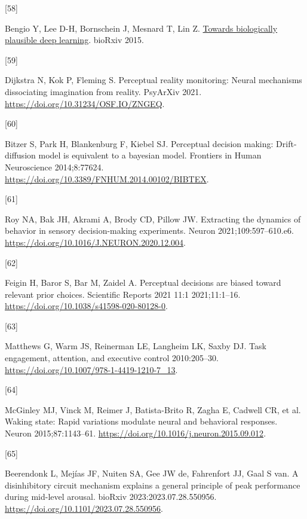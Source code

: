 \documentclass[
]{article}
\newlength{\cslhangindent}
\newlength{\csllabelwidth}
\newlength{\cslentryspacingunit} %
\newenvironment{CSLReferences}[2] %
 {%
  \setlength{\parindent}{0pt}
  \ifodd #1
  \let\oldpar\par
  \def\par{\hangindent=\cslhangindent\oldpar}
  \fi
  \setlength{\parskip}{#2\cslentryspacingunit}
 }%
 {}
\newcommand{\CSLLeftMargin}[1]{\parbox[t]{\csllabelwidth}{#1}}
\newcommand{\CSLRightInline}[1]{\parbox[t]{\linewidth - \csllabelwidth}{#1}\break}
\begin{document}
\begin{CSLReferences}{0}{0}
\leavevmode{}%
\CSLLeftMargin{{[}58{]} }%
\CSLRightInline{Bengio Y, Lee D-H, Bornschein J, Mesnard T, Lin Z.
\href{http://arxiv.org/abs/1502.04156}{Towards biologically plausible
deep learning}. bioRxiv 2015.}

\leavevmode{}%
\CSLLeftMargin{{[}59{]} }%
\CSLRightInline{Dijkstra N, Kok P, Fleming S. Perceptual reality
monitoring: Neural mechanisms dissociating imagination from reality.
PsyArXiv 2021. \url{https://doi.org/10.31234/OSF.IO/ZNGEQ}.}

\leavevmode{}%
\CSLLeftMargin{{[}60{]} }%
\CSLRightInline{Bitzer S, Park H, Blankenburg F, Kiebel SJ. Perceptual
decision making: Drift-diffusion model is equivalent to a bayesian
model. Frontiers in Human Neuroscience 2014;8:77624.
\url{https://doi.org/10.3389/FNHUM.2014.00102/BIBTEX}.}

\leavevmode{}%
\CSLLeftMargin{{[}61{]} }%
\CSLRightInline{Roy NA, Bak JH, Akrami A, Brody CD, Pillow JW.
Extracting the dynamics of behavior in sensory decision-making
experiments. Neuron 2021;109:597--610.e6.
\url{https://doi.org/10.1016/J.NEURON.2020.12.004}.}

\leavevmode{}%
\CSLLeftMargin{{[}62{]} }%
\CSLRightInline{Feigin H, Baror S, Bar M, Zaidel A. Perceptual decisions are biased toward relevant prior choices. Scientific Reports 2021 11:1 2021;11:1–16. \url{https://doi.org/10.1038/s41598-020-80128-0}.}

\leavevmode{}%
\CSLLeftMargin{{[}63{]} }%
\CSLRightInline{Matthews G, Warm JS, Reinerman LE, Langheim LK, Saxby
DJ. Task engagement, attention, and executive control 2010:205--30.
\url{https://doi.org/10.1007/978-1-4419-1210-7_13}.}

\leavevmode{}%
\CSLLeftMargin{{[}64{]} }%
\CSLRightInline{McGinley MJ, Vinck M, Reimer J, Batista-Brito R, Zagha
E, Cadwell CR, et al. Waking state: Rapid variations modulate neural and
behavioral responses. Neuron 2015;87:1143--61.
\url{https://doi.org/10.1016/j.neuron.2015.09.012}.}

\leavevmode{}%
\CSLLeftMargin{{[}65{]} }%
\CSLRightInline{Beerendonk L, Mejías JF, Nuiten SA, Gee JW de,
Fahrenfort JJ, Gaal S van. A disinhibitory circuit mechanism explains a
general principle of peak performance during mid-level arousal. bioRxiv
2023:2023.07.28.550956.
\url{https://doi.org/10.1101/2023.07.28.550956}.}


\end{CSLReferences}
\end{document}
